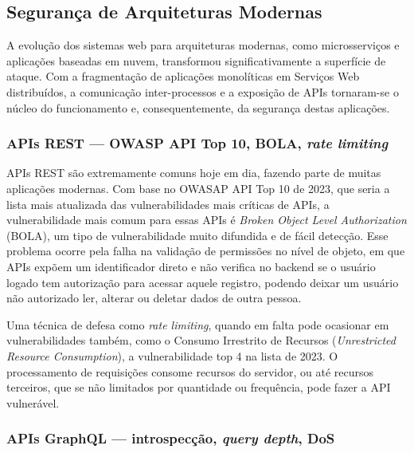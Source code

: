 {
\subsection{
    Segurança de Arquiteturas Modernas
}\label{sec:seguranca_arquiteturas_modernas}

A evolução dos sistemas web para arquiteturas modernas, como microsserviços e aplicações baseadas em nuvem, transformou significativamente a superfície de ataque. Com a fragmentação de aplicações monolíticas em Serviços Web distribuídos, a comunicação inter-processos e a exposição de APIs tornaram-se o núcleo do funcionamento e, consequentemente, da segurança destas aplicações.

\subsubsection{
    APIs REST — OWASP API Top 10, BOLA, \textit{rate limiting}
}\label{sec:apis_rest}

APIs REST são extremamente comuns hoje em dia, fazendo parte de muitas aplicações modernas. Com base no OWASAP API Top 10 de 2023, que seria a lista mais atualizada das vulnerabilidades mais críticas de APIs, a vulnerabilidade mais comum para essas APIs é \textit{Broken Object Level Authorization} (BOLA), um tipo de vulnerabilidade muito difundida e de fácil detecção. Esse problema ocorre pela falha na validação de permissões no nível de objeto, em que APIs expõem um identificador direto e não verifica no backend se o usuário logado tem autorização para acessar aquele registro, podendo deixar um usuário não autorizado ler, alterar ou deletar dados de outra pessoa.

Uma técnica de defesa como \textit{rate limiting}, quando em falta pode ocasionar em vulnerabilidades também, como o Consumo Irrestrito de Recursos (\textit{Unrestricted Resource Consumption}), a vulnerabilidade top 4 na lista de 2023. O processamento de requisições consome recursos do servidor, ou até recursos terceiros, que se não limitados por quantidade ou frequência, pode fazer a API vulnerável.

\subsubsection{
    APIs GraphQL — introspecção, \textit{query depth}, DoS
}\label{sec:apis_graphql}

}
